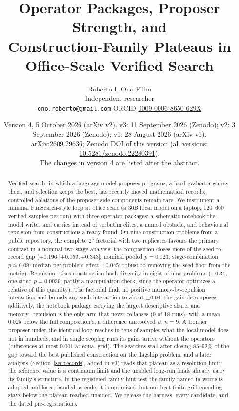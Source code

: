 \documentclass[11pt]{article}
\title{Operator Packages, Proposer Strength, and\\ Construction-Family Plateaus in\\ Office-Scale Verified Search}
\author{Roberto I. Ono Filho\\ Independent researcher\\
\texttt{ono.roberto@gmail.com} \quad ORCID \href{https://orcid.org/0009-0006-8650-629X}{0009-0006-8650-629X}}
\date{Version 4, 5 October 2026 (arXiv v2). v3: 11 September 2026 (Zenodo); v2: 3 September 2026 (Zenodo); v1: 28 August 2026 (arXiv v1).\\ arXiv:2609.29636; Zenodo DOI of this version \href{https://doi.org/\thisdoi}{\thisdoi} (all versions: \href{https://doi.org/10.5281/zenodo.22280391}{10.5281/zenodo.22280391}).\\ The changes in version 4 are listed after the abstract.}
\newcommand{\ci}[2]{[#1,\,#2]}
\begin{document}
\maketitle

\begin{abstract}
Verified search, in which a language model proposes programs, a hard
evaluator scores them, and selection keeps the best, has recently moved
mathematical records; controlled ablations of the proposer-side
components remain rare. We instrument a minimal FunSearch-style loop at
office scale (a 30B local model on a laptop, 120--600 verified samples
per run) with three operator packages: a schematic notebook the model
writes and carries instead of verbatim elites, a named obstacle, and
behavioural repulsion from constructions already found. On nine
construction problems from a public repository, the complete $2^3$
factorial with two replicates favours the primary contrast in a nominal
two-stage analysis: the composition closes more of the seed-to-record
gap ($+0.196$ \ci{+0.059}{+0.343}; nominal pooled $p=0.023$,
stage-combination $p\approx 0.08$; median per-problem effect $+0.045$;
robust to removing the seed floor from the metric). Repulsion raises
construction-hash diversity in eight of nine problems ($+0.31$,
one-sided $p=0.0039$; partly a manipulation check, since the operator
optimizes a relative of this quantity). The factorial finds no positive
memory-by-repulsion interaction and bounds any such interaction to about
$\pm 0.04$: the gain decomposes additively, the notebook package
carrying the largest descriptive share, and memory+repulsion is the only
arm that never collapses (0 of 18 runs), with a mean $0.025$ below the
full composition's, a difference unresolved at $n=9$. A frontier proposer under the identical
loop reaches in tens of samples what the local model does not in
hundreds, and in single scoping runs its gains arrive without the
operators (differences at most $0.001$ at equal grid). The searches
stall after closing 85--92\% of the gap toward the best published
construction on the flagship problem, and a later analysis
(Section~\ref{sec:records}, added in v3) reads that plateau as a
resolution limit: the reference value is a continuum limit and the
unaided long-run finals already carry its family's structure. In the
registered family-hint test the family named in words is adopted and
loses; handed as code, it is optimized, but our best finite-grid
encoding stays below the plateau reached unaided. We release the
harness, every candidate, and the dated pre-registrations.
\end{abstract}
\end{document}
